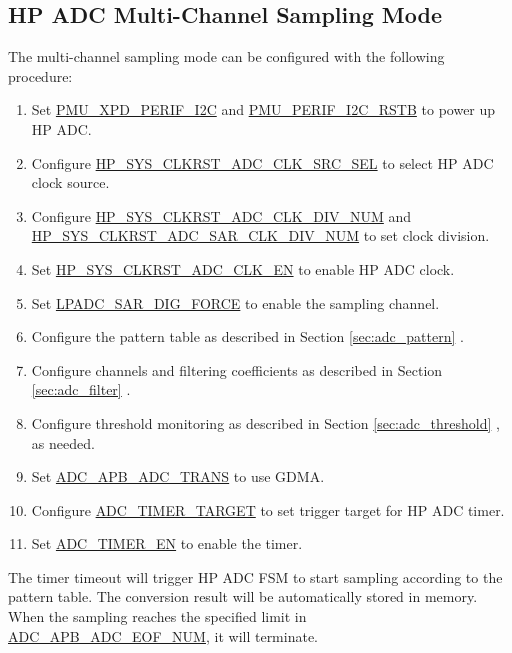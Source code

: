 \documentclass[main\_\_EN.tex]{subfiles}
\begin{document}
\subsection{HP ADC Multi-Channel Sampling Mode}

The multi-channel sampling mode can be configured with the following procedure:

\begin{enumerate}
    \item Set \hyperref[fielddesc:PMUXPDPERIFI2C]{PMU\_XPD\_PERIF\_I2C} and \hyperref[fielddesc:PMUPERIFI2CRSTB]{PMU\_PERIF\_I2C\_RSTB} to power up HP ADC.
    \item Configure \hyperref[fielddesc:HPSYSCLKRSTADCCLKSRCSEL]{HP\_SYS\_CLKRST\_ADC\_CLK\_SRC\_SEL} to select HP ADC clock source.
    \item Configure \hyperref[fielddesc:HPSYSCLKRSTADCCLKDIVNUM]{HP\_SYS\_CLKRST\_ADC\_CLK\_DIV\_NUM} and \hyperref[fielddesc:HPSYSCLKRSTADCSAR1CLKDIVNUM]{HP\_SYS\_CLKRST\_ADC\_SAR\_CLK\_DIV\_NUM} to set clock division.
    \item Set \hyperref[fielddesc:HPSYSCLKRSTADCCLKEN]{HP\_SYS\_CLKRST\_ADC\_CLK\_EN} to enable HP ADC clock.
    \item Set \hyperref[fielddesc:LPADCSAR1DIGFORCE]{LPADC\_SAR\_DIG\_FORCE} to enable the sampling channel.
    \item Configure the pattern table as described in Section \ref{sec:adc_pattern} \textit{}.
    \item Configure channels and filtering coefficients as described in Section \ref{sec:adc_filter} \textit{}.
    \item Configure threshold monitoring as described in Section \ref{sec:adc_threshold} \textit{}, as needed.
    \item Set \hyperref[fielddesc:ADCAPBADCTRANS]{ADC\_APB\_ADC\_TRANS} to use GDMA.
    \item Configure \hyperref[fielddesc:ADCTIMERTARGET]{ADC\_TIMER\_TARGET} to set trigger target for HP ADC timer.
    \item Set \hyperref[fielddesc:ADCTIMEREN]{ADC\_TIMER\_EN} to enable the timer.
\end{enumerate}

The timer timeout will trigger HP ADC FSM to start sampling according to the pattern table. The conversion result will be automatically stored in memory. When the sampling reaches the specified limit in  \hyperref[fielddesc:ADCAPBADCEOFNUM]{ADC\_APB\_ADC\_EOF\_NUM}, it will terminate.
\end{document}

